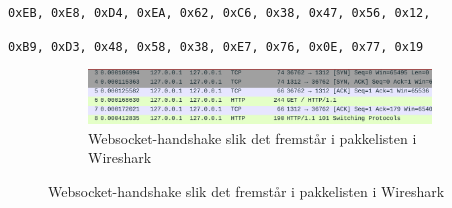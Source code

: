 \documentclass{article}
\newcommand{\code}[1]{\colorbox{light-gray}{\texttt{#1}}}
\begin{document}
\begin{center}
    \code{0xEB, 0xE8, 0xD4, 0xEA, 0x62, 0xC6, 0x38, 0x47, 0x56, 0x12,}
    
    \code{0xB9, 0xD3, 0x48, 0x58, 0x38, 0xE7, 0x76, 0x0E, 0x77, 0x19 }
\end{center}

\begin{figure}[ht]
    \centering
    \begin{subfigure}{\linewidth}
        \centering
        \includegraphics*[width=\linewidth]{illustrasjoner/WS_handshake.png}
        \caption{Websocket-handshake slik det fremstår i pakkelisten i Wireshark}
    \end{subfigure}


\end{figure}
\end{document}
